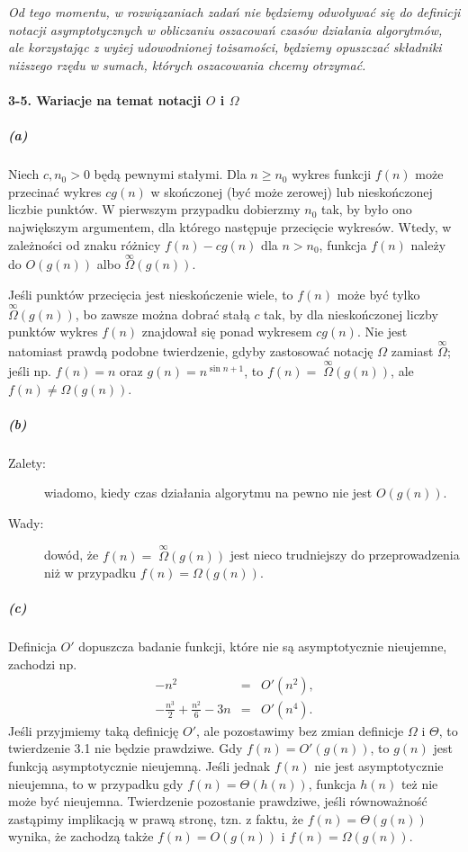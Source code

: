 \bigskip
\noindent \emph{Od tego momentu, w rozwiązaniach zadań nie będziemy odwoływać się do definicji notacji asymptotycznych w obliczaniu oszacowań czasów działania algorytmów, ale korzystając z wyżej udowodnionej tożsamości, będziemy opuszczać składniki niższego rzędu w sumach, których oszacowania chcemy otrzymać.}

\paragraph{3-5. Wariacje na temat notacji $O$ i $\Omega$}

\subparagraph{(a)}
Niech $c,n_0>0$ będą pewnymi stałymi. Dla $n\ge n_0$ wykres funkcji $f(n)$ może przecinać wykres $cg(n)$ w skończonej (być może zerowej) lub nieskończonej liczbie punktów. W pierwszym przypadku dobierzmy $n_0$ tak, by było ono największym argumentem, dla którego następuje przecięcie wykresów. Wtedy, w zależności od znaku różnicy $f(n)-cg(n)$ dla $n>n_0$, funkcja $f(n)$ należy do $O(g(n))$ albo $\stackrel{\infty}{\Omega}\!\!(g(n))$.

Jeśli punktów przecięcia jest nieskończenie wiele, to $f(n)$ może być tylko $\stackrel{\infty}{\Omega}\!\!(g(n))$, bo zawsze można dobrać stałą $c$ tak, by dla nieskończonej liczby punktów wykres $f(n)$ znajdował się ponad wykresem $cg(n)$. Nie jest natomiast prawdą podobne twierdzenie, gdyby zastosować notację $\Omega$ zamiast $\stackrel{\infty}{\Omega}$; jeśli np. $f(n)=n$ oraz $g(n)=n^{\sin n+1}$, to $f(n)=\;\stackrel{\infty}{\Omega}\!\!(g(n))$, ale $f(n)\ne\Omega(g(n))$.

\subparagraph{(b)}
\begin{description}
  \item[Zalety:] wiadomo, kiedy czas działania algorytmu na pewno nie jest $O(g(n))$.
  \item[Wady:] dowód, że $f(n)=\;\stackrel{\infty}{\Omega}\!\!(g(n))$ jest nieco trudniejszy do przeprowadzenia niż w przypadku $f(n)=\Omega(g(n))$.
\end{description}

\subparagraph{(c)}
Definicja $O'$ dopuszcza badanie funkcji, które nie są asymptotycznie nieujemne, zachodzi np.
\begin{eqnarray*}
  -n^2 &=& O'(n^2), \\
  -\frac{n^3}{2}+\frac{n^2}{6}-3n &=& O'(n^4).
\end{eqnarray*}
Jeśli przyjmiemy taką definicję $O'$, ale pozostawimy bez zmian definicje $\Omega$ i $\Theta$, to twierdzenie 3.1 nie będzie prawdziwe. Gdy $f(n)=O'(g(n))$, to $g(n)$ jest funkcją asymptotycznie nieujemną. Jeśli jednak $f(n)$ nie jest asymptotycznie nieujemna, to w przypadku gdy $f(n)=\Theta(h(n))$, funkcja $h(n)$ też nie może być nieujemna. Twierdzenie pozostanie prawdziwe, jeśli równoważność zastąpimy implikacją w prawą stronę, tzn. z faktu, że $f(n)=\Theta(g(n))$ wynika, że zachodzą także $f(n)=O(g(n))$ i $f(n)=\Omega(g(n))$.

